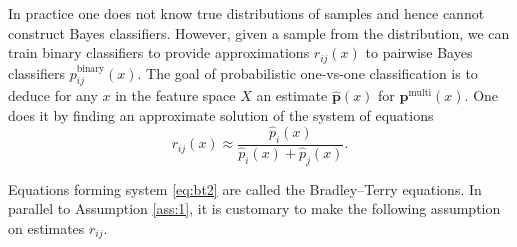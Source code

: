 In practice one does not  know true distributions of samples and hence cannot 
construct Bayes classifiers. However, given a sample from the distribution, 
we can train binary classifiers to provide approximations $r_{ij}(x)$ to 
pairwise Bayes classifiers $p_{ij}^\textrm{binary}(x)$. The goal of probabilistic
one-vs-one classification is to deduce for any $x$ in the feature space $X$ an 
estimate $\hat{\boldsymbol{p}}(x)$ for $\boldsymbol{p}^\textrm{multi}(x)$. 
One does it by finding an approximate solution of the system of equations
%
%
%
%
%
%
%
%
\begin{equation}
	{r}_{ij}(x) \approx \frac {\hat p_i(x)}{\hat p_i(x) + \hat p_j(x)}. \label{eq:bt2}
\end{equation}


Equations forming system \eqref{eq:bt2} are called the Bradley--Terry equations. In parallel to Assumption \ref{ass:1}, it is customary to make the following assumption on estimates $r_{ij}$.

